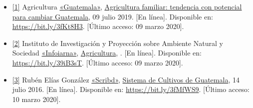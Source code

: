 \documentclass[12pt,spanish,Letterpaper,openany]{book}
\newcommand{\spaceminusmilis}{\vspace{-0.5mm}}
\begin{document}
\begin{itemize}
\item
  \hypertarget{articulo07_ref01}{}

  \protect\hyperlink{articulo07_cross01}{{[}1{]}} Agricultura \href{https://www.guatemala.com/}{«Guatemala»}, \href{https://www.guatemala.com/desarrollo/economia/agricultura-familiar-tendencia-con-potencial-para-cambiar-guatemala.html}{Agricultura familiar: tendencia con potencial para cambiar Guatemala}, 09 julio 2019. {[}En línea{]}. Disponible en: \url{https://bit.ly/3fKt8H3}. {[}Último acceso: 09 marzo 2020{]}.
\item
  \hypertarget{articulo07_ref02}{}

  \protect\hyperlink{articulo07_cross02}{{[}2{]}} Instituto de Investigación y Proyección sobre Ambiente Natural y Sociedad \href{http://www.infoiarna.org.gt/}{«Infoiarna»}, \href{http://www.infoiarna.org.gt/temas/agricultura/}{Agricultura}, . {[}En línea{]}. Disponible en: \url{https://bit.ly/39iB3sT}. {[}Último acceso: 09 marzo 2020{]}.
\item
  \hypertarget{articulo07_ref03}{}

  \protect\hyperlink{articulo07_cross03}{{[}3{]}} Rubén Elías González \href{https://es.scribd.com/}{«Scribd»}, \href{https://es.scribd.com/document/318239266/SISTEMA-DE-CULTIVOS-DE-GUATEMALA-docx}{Sistema de Cultivos de Guatemala}, 14 julio 2016. {[}En línea{]}. Disponible en: \url{https://bit.ly/3fMfWS9}. {[}Último acceso: 10 marzo 2020{]}.
\end{itemize}

\spaceminusmilis
\end{document}
